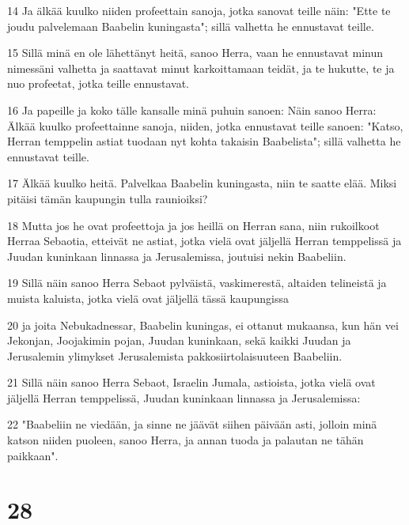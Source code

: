 \par 14 Ja älkää kuulko niiden profeettain sanoja, jotka sanovat teille näin: "Ette te joudu palvelemaan Baabelin kuningasta"; sillä valhetta he ennustavat teille.
\par 15 Sillä minä en ole lähettänyt heitä, sanoo Herra, vaan he ennustavat minun nimessäni valhetta ja saattavat minut karkoittamaan teidät, ja te hukutte, te ja nuo profeetat, jotka teille ennustavat.
\par 16 Ja papeille ja koko tälle kansalle minä puhuin sanoen: Näin sanoo Herra: Älkää kuulko profeettainne sanoja, niiden, jotka ennustavat teille sanoen: "Katso, Herran temppelin astiat tuodaan nyt kohta takaisin Baabelista"; sillä valhetta he ennustavat teille.
\par 17 Älkää kuulko heitä. Palvelkaa Baabelin kuningasta, niin te saatte elää. Miksi pitäisi tämän kaupungin tulla raunioiksi?
\par 18 Mutta jos he ovat profeettoja ja jos heillä on Herran sana, niin rukoilkoot Herraa Sebaotia, etteivät ne astiat, jotka vielä ovat jäljellä Herran temppelissä ja Juudan kuninkaan linnassa ja Jerusalemissa, joutuisi nekin Baabeliin.
\par 19 Sillä näin sanoo Herra Sebaot pylväistä, vaskimerestä, altaiden telineistä ja muista kaluista, jotka vielä ovat jäljellä tässä kaupungissa
\par 20 ja joita Nebukadnessar, Baabelin kuningas, ei ottanut mukaansa, kun hän vei Jekonjan, Joojakimin pojan, Juudan kuninkaan, sekä kaikki Juudan ja Jerusalemin ylimykset Jerusalemista pakkosiirtolaisuuteen Baabeliin.
\par 21 Sillä näin sanoo Herra Sebaot, Israelin Jumala, astioista, jotka vielä ovat jäljellä Herran temppelissä, Juudan kuninkaan linnassa ja Jerusalemissa:
\par 22 "Baabeliin ne viedään, ja sinne ne jäävät siihen päivään asti, jolloin minä katson niiden puoleen, sanoo Herra, ja annan tuoda ja palautan ne tähän paikkaan".

\chapter{28}


